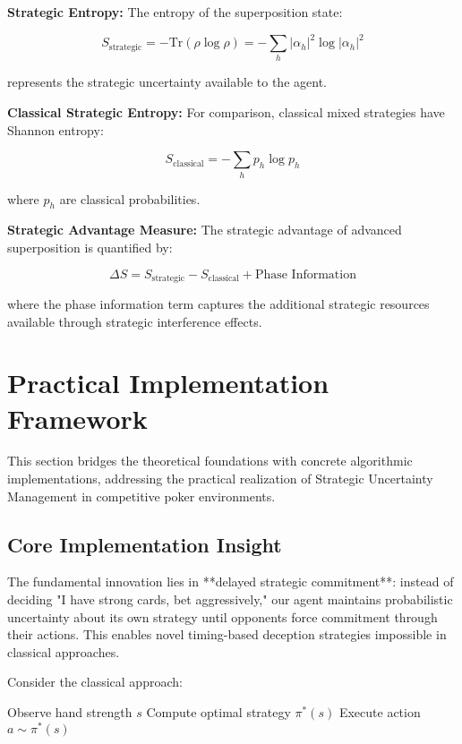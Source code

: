 \documentclass[11pt,a4paper]{article}
\begin{document}
\textbf{Strategic Entropy:} The entropy of the superposition state:

\begin{equation}
S_{\text{strategic}} = -\text{Tr}(\rho \log \rho) = -\sum_h |\alpha_h|^2 \log |\alpha_h|^2
\end{equation}

represents the strategic uncertainty available to the agent.

\textbf{Classical Strategic Entropy:} For comparison, classical mixed strategies have Shannon entropy:

\begin{equation}
S_{\text{classical}} = -\sum_h p_h \log p_h
\end{equation}

where $p_h$ are classical probabilities.

\textbf{Strategic Advantage Measure:} The strategic advantage of advanced superposition is quantified by:

\begin{equation}
\Delta S = S_{\text{strategic}} - S_{\text{classical}} + \text{Phase Information}
\end{equation}

where the phase information term captures the additional strategic resources available through strategic interference effects.

\section{Practical Implementation Framework}

This section bridges the theoretical foundations with concrete algorithmic implementations, addressing the practical realization of Strategic Uncertainty Management in competitive poker environments.

\subsection{Core Implementation Insight}

The fundamental innovation lies in **delayed strategic commitment**: instead of deciding "I have strong cards, bet aggressively," our agent maintains probabilistic uncertainty about its own strategy until opponents force commitment through their actions. This enables novel timing-based deception strategies impossible in classical approaches.

Consider the classical approach:
\begin{algorithmic}
\STATE Observe hand strength $s$
\STATE Compute optimal strategy $\pi^*(s)$
\STATE Execute action $a \sim \pi^*(s)$
\end{algorithmic}
\end{document}
